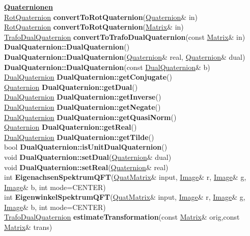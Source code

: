 \documentclass[10pt,titlepage]{article}
\newcommand{\subtitle}[1]{{\noindent\bf#1}}
\def\functionlistentry#1#2#3#4#5#6{\noindent #1 {\bf #2}(#3) \dotfill #6\\}
\begin{document}
{{\subtitle{\hyperlink{SECTION:quaternions}{Quaternionen}}\\
\functionlistentry{\hyperlink{RotQuaternion}{RotQuaternion}}{convertToRotQuaternion}{\hyperlink{Quaternion}{Quaternion}\& in}{1502}{quaternions}{}
\functionlistentry{\hyperlink{RotQuaternion}{RotQuaternion}}{convertToRotQuaternion}{\hyperlink{Matrix}{Matrix}\& in}{1503}{quaternions}{}
\functionlistentry{\hyperlink{TrafoDualQuaternion}{TrafoDualQuaternion}}{convertToTrafoDualQuaternion}{const \hyperlink{Matrix}{Matrix}\& in}{1538}{quaternions}{}
\functionlistentry{}{DualQuaternion::DualQuaternion}{}{1513}{quaternions}{}
\functionlistentry{}{DualQuaternion::DualQuaternion}{\hyperlink{Quaternion}{Quaternion}\& real, \hyperlink{Quaternion}{Quaternion}\& dual}{1514}{quaternions}{}
\functionlistentry{}{DualQuaternion::DualQuaternion}{const \hyperlink{DualQuaternion}{DualQuaternion}\& b}{1515}{quaternions}{}
\functionlistentry{\hyperlink{DualQuaternion}{DualQuaternion}}{DualQuaternion::getConjugate}{}{1521}{quaternions}{}
\functionlistentry{\hyperlink{Quaternion}{Quaternion}}{DualQuaternion::getDual}{}{1517}{quaternions}{}
\functionlistentry{\hyperlink{DualQuaternion}{DualQuaternion}}{DualQuaternion::getInverse}{}{1523}{quaternions}{}
\functionlistentry{\hyperlink{DualQuaternion}{DualQuaternion}}{DualQuaternion::getNegate}{}{1520}{quaternions}{}
\functionlistentry{\hyperlink{DualQuaternion}{DualQuaternion}}{DualQuaternion::getQuasiNorm}{}{1524}{quaternions}{}
\functionlistentry{\hyperlink{Quaternion}{Quaternion}}{DualQuaternion::getReal}{}{1516}{quaternions}{}
\functionlistentry{\hyperlink{DualQuaternion}{DualQuaternion}}{DualQuaternion::getTilde}{}{1522}{quaternions}{}
\functionlistentry{bool}{DualQuaternion::isUnitDualQuaternion}{}{1525}{quaternions}{}
\functionlistentry{void}{DualQuaternion::setDual}{\hyperlink{Quaternion}{Quaternion}\& dual}{1519}{quaternions}{}
\functionlistentry{void}{DualQuaternion::setReal}{\hyperlink{Quaternion}{Quaternion}\& real}{1518}{quaternions}{}
\functionlistentry{int}{EigenachsenSpektrumQFT}{\hyperlink{QuatMatrix}{QuatMatrix}\& input, \hyperlink{Image}{Image}\& r, \hyperlink{Image}{Image}\& g, \hyperlink{Image}{Image}\& b, int mode=CENTER}{1543}{quaternions}{}
\functionlistentry{int}{EigenwinkelSpektrumQFT}{\hyperlink{QuatMatrix}{QuatMatrix}\& input, \hyperlink{Image}{Image}\& r, \hyperlink{Image}{Image}\& g, \hyperlink{Image}{Image}\& b, int mode=CENTER}{1542}{quaternions}{}
\functionlistentry{\hyperlink{TrafoDualQuaternion}{TrafoDualQuaternion}}{estimateTransformation}{const \hyperlink{Matrix}{Matrix}\& orig,const \hyperlink{Matrix}{Matrix}\& trans}{1539}{quaternions}{}
}}
\end{document}
